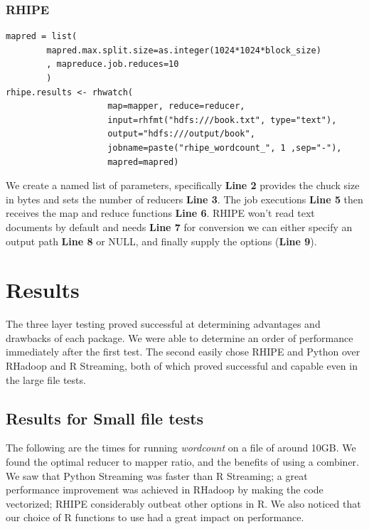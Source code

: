 \documentclass[
journal=jacsat, %
manuscript=article]{achemso}
\begin{document}
\subsubsection{RHIPE}
\begin{lstlisting}
mapred = list(
        mapred.max.split.size=as.integer(1024*1024*block_size)
        , mapreduce.job.reduces=10
        )
rhipe.results <- rhwatch(
                    map=mapper, reduce=reducer,
                    input=rhfmt("hdfs:///book.txt", type="text"),
                    output="hdfs:///output/book",
                    jobname=paste("rhipe_wordcount_", 1 ,sep="-"),
                    mapred=mapred)
\end{lstlisting}
We create a named list of parameters, specifically \textbf{Line 2} provides the chuck size in bytes and sets the number of reducers \textbf{Line 3}. The job executions \textbf{Line 5} then receives the map and reduce functions \textbf{Line 6}.
RHIPE won't read text documents by default and needs \textbf{Line 7} for conversion we can either specify an output path \textbf{Line 8} or NULL, and finally supply the options (\textbf{Line 9}). 

\section{Results}
The three layer testing proved successful at determining advantages and drawbacks of each package. We were able to determine an order of performance immediately after the first test. The second easily chose RHIPE and Python over RHadoop and R Streaming, both of which proved successful and capable even in the large file tests.

\subsection{Results for Small file tests}
The following are the times for running \textit{wordcount} on a file of around 10GB. We found the optimal reducer to mapper ratio, and the benefits of using a combiner. We saw that Python Streaming was faster than R Streaming; a great performance improvement was achieved in RHadoop by making the code vectorized; RHIPE considerably outbeat other options in R. We also noticed that our choice of R functions to use had a great impact on performance.
\end{document}
